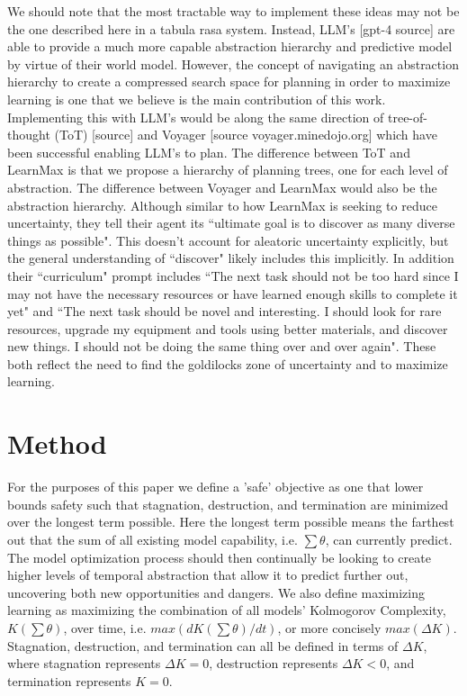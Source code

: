\documentclass{article}
\begin{document}
We should note that the most tractable way to implement these ideas may not be the one described here in a tabula rasa system. Instead, LLM's [gpt-4 source] are able to provide a much more capable abstraction hierarchy and predictive model by virtue of their world model. However, the concept of navigating an abstraction hierarchy to create a compressed search space for planning in order to maximize learning is one that we believe is the main contribution of this work. Implementing this with LLM's would be along the same direction of tree-of-thought (ToT) [source] and Voyager [source voyager.minedojo.org] which have been successful enabling LLM's to plan. The difference between ToT and LearnMax is that we propose a hierarchy of planning trees, one for each level of abstraction. The difference between Voyager and LearnMax would also be the abstraction hierarchy. Although similar to how LearnMax is seeking to reduce uncertainty, they tell their agent its \textquotedblleft ultimate goal is to discover as many diverse things as possible". This doesn't account for aleatoric uncertainty explicitly, but the general understanding of \textquotedblleft discover" likely includes this implicitly. In addition their \textquotedblleft curriculum" prompt includes \textquotedblleft The next task should not be too hard since I may not have the necessary resources or have learned enough skills to complete it yet" and \textquotedblleft The next task should be novel and interesting. I should look for rare resources, upgrade my equipment and tools using better materials, and discover new things. I should not be doing the same thing over and over again". These both reflect the need to find the goldilocks zone of uncertainty and to maximize learning.

\section{Method}

For the purposes of this paper we define a 'safe' objective as one that lower bounds safety such that stagnation, destruction, and termination are minimized over the longest term possible. Here the longest term possible means the farthest out that the sum of all existing model capability, i.e. $\sum{}\theta$, can currently predict. The model optimization process should then continually \cite{stanley2005evolving} be looking to create higher levels of temporal abstraction that allow it to predict further out, uncovering both new opportunities and dangers. We also define maximizing learning as maximizing the combination of all models' Kolmogorov Complexity\cite{li2008introduction}, $K(\sum{}\theta)$, over time, i.e. $max(dK(\sum{}\theta)/dt)$, or more concisely $max(\Delta K)$. Stagnation, destruction, and termination can all be defined in terms of $\Delta K$, where stagnation represents $\Delta K = 0$, destruction represents $\Delta K < 0$, and termination represents $K = 0$.
\end{document}

